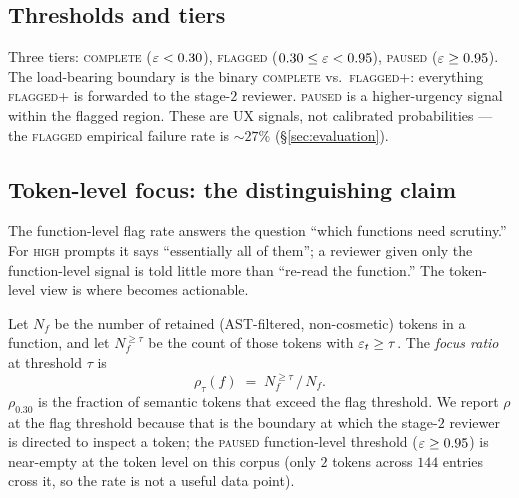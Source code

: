 \subsection{Thresholds and tiers}
\label{subsec:tiers}

Three tiers: \textsc{complete} ($\varepsilon < 0.30$), \textsc{flagged}
($0.30 \le \varepsilon < 0.95$), \textsc{paused} ($\varepsilon \ge 0.95$). The
load-bearing boundary is the binary \textsc{complete} vs.\
\textsc{flagged+}: everything \textsc{flagged+} is forwarded to the
stage-$2$ reviewer. \textsc{paused} is a higher-urgency signal
within the flagged region. These are UX signals, not
calibrated probabilities --- the \textsc{flagged} empirical failure
rate is $\sim 27\%$ (\S\ref{sec:evaluation}).

\subsection{Token-level focus: the distinguishing claim}
\label{subsec:token-focus}

The function-level flag rate answers the question ``which functions
need scrutiny.'' For \textsc{high} prompts it says ``essentially all
of them''; a reviewer given only the function-level signal is told
little more than ``re-read the function.'' The token-level view is
where \eps becomes actionable.

Let $N_f$ be the number of retained (AST-filtered, non-cosmetic)
tokens in a function, and let $N_f^{\ge\tau}$ be the count of those
tokens with $\varepsilon_t \ge \tau$. The \emph{focus ratio} at threshold
$\tau$ is
\begin{equation}
  \rho_\tau(f) \;=\; N_f^{\ge\tau} \,/\, N_f.
  \label{eq:focus}
\end{equation}
$\rho_{0.30}$ is the fraction of semantic tokens that exceed the
flag threshold. We report $\rho$ at the flag threshold because that
is the boundary at which the stage-$2$ reviewer is directed to
inspect a token; the \textsc{paused} function-level threshold
($\varepsilon \ge 0.95$) is near-empty at the token level on this corpus
(only $2$ tokens across $144$ entries cross it, so the rate is not
a useful data point).

